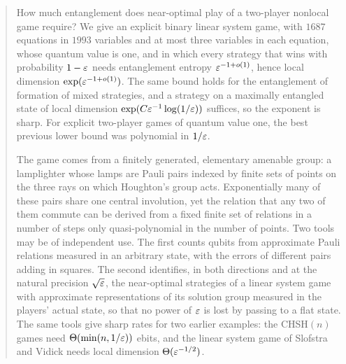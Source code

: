 \begin{abstract}
How much entanglement does near-optimal play of a two-player nonlocal game require? We give an explicit binary linear system game,
with $1687$ equations in $1993$ variables and at most three variables in each equation, whose quantum value is one, and in which every
strategy that wins with probability $1-\eps$ needs entanglement entropy $\eps^{-1+o(1)}$, hence local dimension $\exp(\eps^{-1+o(1)})$.
The same bound holds for the entanglement of formation of mixed strategies, and a strategy on a maximally entangled state of local
dimension $\exp(C\eps^{-1}\log(1/\eps))$ suffices, so the exponent is sharp. For explicit two-player games of quantum value one, the best
previous lower bound was polynomial in $1/\eps$.

The game comes from a finitely generated, elementary amenable group: a lamplighter whose lamps are Pauli pairs indexed by finite sets
of points on the three rays on which Houghton's group acts. Exponentially many of these pairs share one central involution, yet the
relation that any two of them commute can be derived from a fixed finite set of relations in a number of steps only quasi-polynomial in
the number of points. Two tools may be of independent use. The first counts qubits from approximate
Pauli relations measured in an arbitrary state, with the errors of different pairs adding in squares. The second identifies, in both
directions and at the natural precision $\sqrt\eps$, the near-optimal strategies of a linear system game with approximate representations
of its solution group measured in the players' actual state, so that no power of $\eps$ is lost by passing to a flat state. The same tools
give sharp rates for two earlier examples: the CHSH$(n)$ games need $\Theta(\min(n,1/\eps))$ ebits, and the linear system game of
Slofstra and Vidick needs local dimension $\Theta(\eps^{-1/2})$.
\end{abstract}

\vspace{0.4em}
